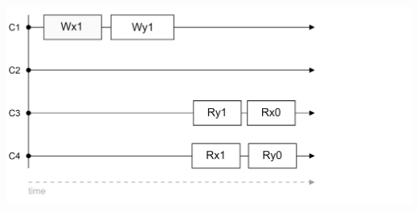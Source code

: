 \begin{multicols}{2}
\hspace{-1.5em}
\includegraphics[width=\linewidth]{Sections/consist/seq3.png}\\




\end{multicols}


\newpage 


